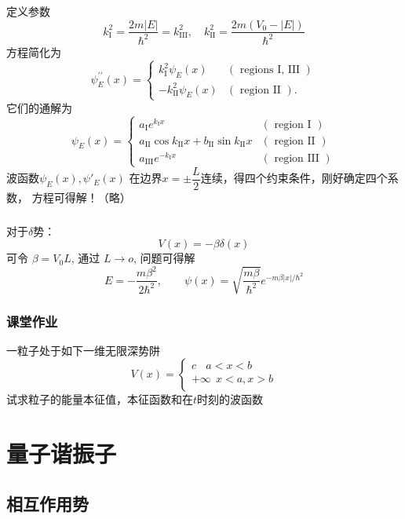 \begin{frame}[label=current]
  \frametitle{}
定义参数 \[ k_{\mathrm{I}}^{2}=\frac{2 m|E|}{\hbar^{2}}=k_{\mathrm{III}}^{2}, \quad k_{\mathrm{II}}^{2}=\frac{2 m\left(V_{0}-|E|\right)}{\hbar^{2}}\]
方程简化为
\[ \psi_{E}^{\prime \prime}(x)=\left\{\begin{array}{ll}
  k_{\mathrm{I}}^{2} \psi_{E}(x) & (\text { regions I, III }) \\
  -k_{\mathrm{II}}^{2} \psi_{E}(x) & (\text { region II }) .
  \end{array}\right.\]
它们的通解为
\[ \psi_{E}(x)=\left\{\begin{array}{ll}
  a_{\mathrm{I}} e^{k_{\mathrm{I}} x} & (\text { region I } )\\
  a_{\mathrm{II}} \cos k_{\mathrm{II}} x+b_{\mathrm{II}} \sin k_{\mathrm{II}} x & (\text { region II } )\\
  a_{\mathrm{III}} e^{-k_{\mathrm{I}} x} & (\text { region III })
  \end{array}\right.\]
  波函数$\psi_{E}(x), \psi'_{E}(x)$ 在边界$ x= \pm \dfrac{L}{2}$连续，得四个约束条件，刚好确定四个系数， 方程可得解！（略）
\end{frame} 

\begin{frame}[label=current]
  \frametitle{}
对于$\delta$势： 
\[ V(x) = - \beta \delta(x)\] 
可令 $\beta = V_0 L$, 通过 $L \to o$, 问题可得解
\[ E = - \frac{m \beta ^2}{2 \hbar^2}, \qquad \psi(x)=\sqrt{\frac{m \beta}{\hbar^{2}}} e^{-m \beta|x| / \hbar^{2}}\]
\end{frame} 

\begin{frame}[label=current]
  \frametitle{课堂作业}
  一粒子处于如下一维无限深势阱
$$ \displaystyle 
 V(x)=\left \{ 
 \begin{array}{cccc}
   c	~~ ~~ a<x<b \\  
   +\infty ~~x<a, x>b\\
 \end{array}
 \right.
 $$ 
 试求粒子的能量本征值，本征函数和在$t$时刻的波函数
\end{frame} 

\section{量子谐振子}

\subsection{相互作用势}

